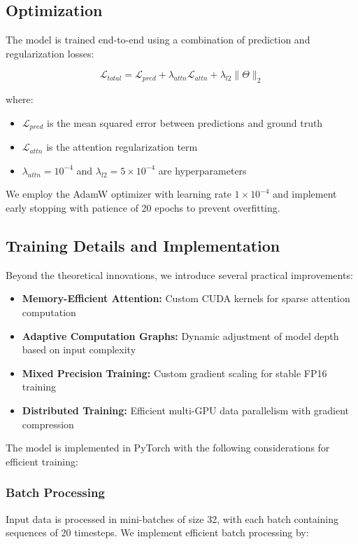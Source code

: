 \documentclass[lettersize, journal]{IEEEtran}
\begin{document}
\subsection{Optimization}
The model is trained end-to-end using a combination of prediction and regularization losses:

\begin{equation}
\mathcal{L}_{total} = \mathcal{L}_{pred} + \lambda_{attn}\mathcal{L}_{attn} + \lambda_{l2}\|\Theta\|_2
\end{equation}

where:
\begin{itemize}
    \item $\mathcal{L}_{pred}$ is the mean squared error between predictions and ground truth
    \item $\mathcal{L}_{attn}$ is the attention regularization term
    \item $\lambda_{attn} = 10^{-4}$ and $\lambda_{l2} = 5 \times 10^{-4}$ are hyperparameters
\end{itemize}

We employ the AdamW optimizer with learning rate $1 \times 10^{-4}$ and implement early stopping with patience of 20 epochs to prevent overfitting.

\subsection{Training Details and Implementation}
Beyond the theoretical innovations, we introduce several practical improvements:

\begin{itemize}
    \item \textbf{Memory-Efficient Attention:} Custom CUDA kernels for sparse attention computation
    \item \textbf{Adaptive Computation Graphs:} Dynamic adjustment of model depth based on input complexity
    \item \textbf{Mixed Precision Training:} Custom gradient scaling for stable FP16 training
    \item \textbf{Distributed Training:} Efficient multi-GPU data parallelism with gradient compression
\end{itemize}

The model is implemented in PyTorch with the following considerations for efficient training:

\subsubsection{Batch Processing}
Input data is processed in mini-batches of size 32, with each batch containing sequences of 20 timesteps. We implement efficient batch processing by:
\end{document}
